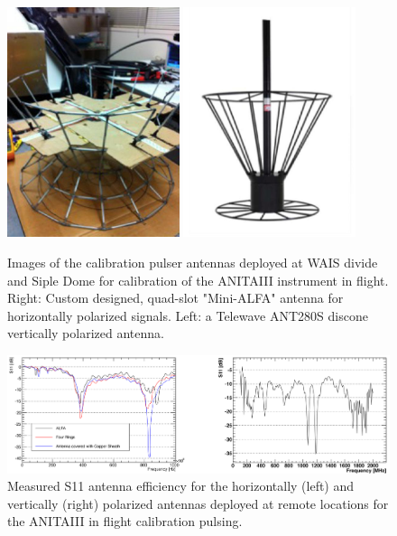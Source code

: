 	\begin{figure}
		\includegraphics[width=0.45\textwidth]{figures/waisPulserAntennaH}
		\includegraphics[width=0.45\textwidth]{figures/waisPulserAntennaV}
		\caption{Images of the calibration pulser antennas deployed at WAIS divide and Siple Dome for calibration of the ANITAIII instrument in flight.  Right: Custom designed, quad-slot "Mini-ALFA" antenna for horizontally polarized signals.  Left: a Telewave ANT280S discone vertically polarized antenna. \cite{StephCalPulserPresentation}}
		\label{fig:waisPulserAntenna}
	\end{figure}	
	
	\begin{figure}
		\includegraphics[width=\textwidth]{figures/waisPulserAntennaSpectrum}
		\caption{Measured S11 antenna efficiency for the horizontally (left) and vertically (right) polarized antennas deployed at remote locations for the ANITAIII in flight calibration pulsing. \cite{StephCalPulserPresentation}}
		\label{fig:waisPulserAntennaResponse}
	\end{figure}
	
